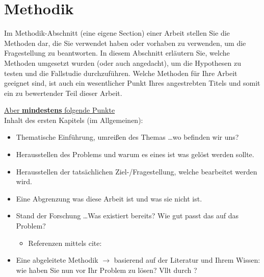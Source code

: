 \newpage

\section{Methodik}

Im Methodik-Abschnitt (eine eigene Section) einer Arbeit stellen Sie die Methoden dar,
die Sie verwendet haben oder vorhaben zu verwenden, um die Fragestellung zu beantworten. 
In diesem Abschnitt erläutern Sie, welche Methoden umgesetzt wurden (oder auch angedacht),
um die Hypothesen zu testen und die Fallstudie durchzuführen. 
Welche Methoden für Ihre Arbeit geeignet sind, ist auch ein wesentlicher Punkt Ihres
angestrebten Titels und somit ein zu bewertender Teil dieser Arbeit. 

\underline{Aber \textbf{mindestens} folgende Punkte}\\
Inhalt des ersten Kapitels (im Allgemeinen):
\begin{itemize}
    \item Thematische Einführung, umreißen des Themas \dots wo befinden wir uns?
    \item Herausstellen des Problems und warum es eines ist was gelöst werden sollte.
    \item Herausstellen der tatsächlichen Ziel-/Fragestellung, welche bearbeitet werden wird.
    \item Eine Abgrenzung was diese Arbeit ist und was sie nicht ist.
    \item Stand der Forschung \dots Was existiert bereits? Wie gut passt das auf das Problem?
    \begin{itemize}
        \item Referenzen mittels cite: \cite[S.~111]{jsch2011} \cite[S.~27f]{Tane2014}
    \end{itemize}
    \item Eine abgeleitete Methodik $\rightarrow$ basierend auf der Literatur und Ihrem Wissen: wie haben Sie nun vor Ihr Problem zu lösen? Vllt durch \cite{9429985}?
\end{itemize}
